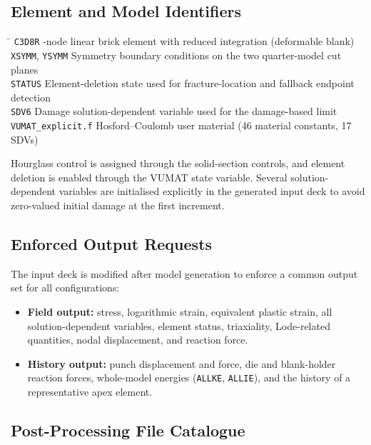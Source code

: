 \subsection{Element and Model Identifiers}

\begin{tabbing}
 \hspace*{4.0cm} \= \kill
 \texttt{C3D8R}                -node linear brick element with reduced integration (deformable blank) \\[0.5ex]
 \texttt{XSYMM}, \texttt{YSYMM} \> Symmetry boundary conditions on the two quarter-model cut planes \\[0.5ex]
 \texttt{STATUS}              \> Element-deletion state used for fracture-location and fallback endpoint detection \\[0.5ex]
 \texttt{SDV6}                \> Damage solution-dependent variable used for the damage-based limit \\[0.5ex]
 \texttt{VUMAT\_explicit.f}   \> Hosford--Coulomb user material (46 material constants, 17 SDVs)
\end{tabbing}

Hourglass control is assigned through the solid-section controls, and element
deletion is enabled through the VUMAT state variable. Several solution-dependent
variables are initialised explicitly in the generated input deck to avoid
zero-valued initial damage at the first increment.

\subsection{Enforced Output Requests}

The input deck is modified after model generation to enforce a common output set
for all configurations:
\begin{itemize}
  \item \textbf{Field output:} stress, logarithmic strain, equivalent plastic
  strain, all solution-dependent variables, element status, triaxiality,
  Lode-related quantities, nodal displacement, and reaction force.
  \item \textbf{History output:} punch displacement and force, die and
  blank-holder reaction forces, whole-model energies (\texttt{ALLKE},
  \texttt{ALLIE}), and the history of a representative apex element.
\end{itemize}

\subsection{Post-Processing File Catalogue}
\label{app:postproc_catalogue}

